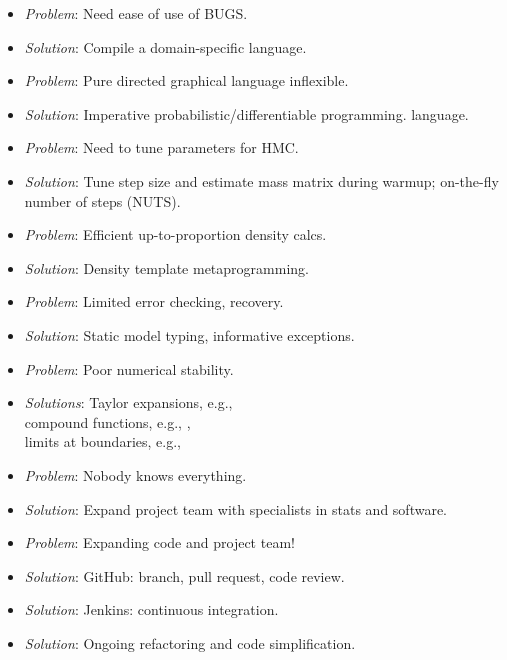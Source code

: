 \documentclass[10pt]{report}
\begin{document}
%
\begin{itemize}
\item {\slshape Problem}:  Need ease of use of BUGS.
\item {\slshape Solution}: Compile a domain-specific language.
%
\vspace*{8pt}
\item {\slshape Problem}:  Pure directed graphical language inflexible.
\item {\slshape Solution}: Imperative probabilistic/differentiable programming.
  language.
\vspace*{8pt}
\item {\slshape Problem}:  Need to tune parameters for HMC.
\item {\slshape Solution}: Tune step size and estimate mass matrix
  during warmup;  on-the-fly number of steps (NUTS).
%
\end{itemize}


%
\begin{itemize}
%
\vspace*{4pt}
\item {\slshape Problem}:  Efficient up-to-proportion density calcs.
\item {\slshape Solution}: Density template metaprogramming.
%
\vspace*{4pt}
\item {\slshape Problem}:  Limited error checking, recovery.
\item {\slshape Solution}: Static model typing, informative exceptions.
%
\vspace*{4pt}
\item {\slshape Problem}:  Poor numerical stability.
\item {\slshape Solutions}:
{
Taylor expansions, e.g., {\small {}}
\\[2pt]
compound functions, e.g., {\small {}, \
}
\\[2pt]
limits at boundaries, e.g., {\small {}}
}
%
\end{itemize}


%
\begin{itemize}
\item {\slshape Problem}:  Nobody knows everything.
\item {\slshape Solution}: Expand project team with specialists in stats and software.
\vspace*{8pt}
\item {\slshape Problem}:  Expanding code and project team!
\item {\slshape Solution}: GitHub: branch, pull
  request, code review.
\item {\slshape Solution}: Jenkins: continuous integration.
\item {\slshape Solution}: Ongoing refactoring and code simplification.
%
\end{itemize}
\end{document}
